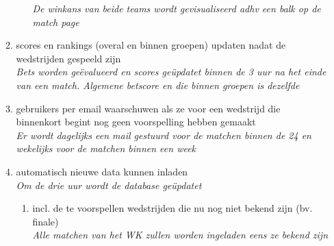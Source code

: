 \documentclass[11pt, a4paper]{article}
\begin{document}
\begin{enumerate}
\begin{enumerate}
\begin{enumerate}
 \textit{De winkans van beide teams wordt gevisualiseerd adhv een balk op de match page}
 \end{enumerate}
 \item scores en rankings (overal en binnen groepen) updaten nadat de wedstrijden gespeeld zijn \\
 \textit{Bets worden ge\"evalueerd en scores ge\"updatet binnen de 3 uur na het einde van een match. Algemene betscore en die binnen groepen is dezelfde}
 \item gebruikers per email waarschuwen als ze voor een wedstrijd die binnenkort begint nog geen voorspelling hebben gemaakt \\
 \textit{Er wordt dagelijks een mail gestuurd voor de matchen binnen de 24 en wekelijks voor de matchen binnen een week}
 \item automatisch nieuwe data kunnen inladen \\
 \textit{Om de drie uur wordt de database ge\"updatet}
 \begin{enumerate}
 \item incl. de te voorspellen wedstrijden die nu nog niet bekend zijn (bv. finale) \\
 \textit{Alle matchen van het WK zullen worden ingeladen eens ze bekend zijn}
 \end{enumerate}
 \end{enumerate}
 \end{enumerate}


\end{document}
